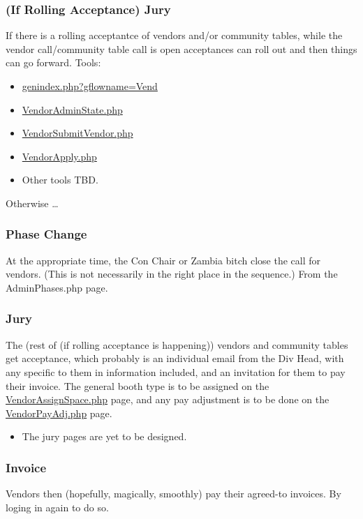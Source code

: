 \documentclass[captions=tablesignature]{scrartcl}
\begin{document}
\subsubsection{(If Rolling Acceptance) Jury}
\label{sec-3-2-13}
If there is a rolling acceptantce of vendors and/or community
tables, while the vendor call/community table call is open
acceptances can roll out and then things can go forward.
Tools: 
\begin{itemize}
\item \href{../webpages/genindex.php?gflowname=Vend}{genindex.php?gflowname=Vend}
\item \href{../webpages/VendorAdminState.php}{VendorAdminState.php}
\item \href{../webpages/VendorSubmitVendor.php}{VendorSubmitVendor.php}
\item \href{../webpages/VendorApply.php}{VendorApply.php}
\item Other tools TBD.
\end{itemize}
Otherwise \ldots{}

\subsubsection{Phase Change}
\label{sec-3-2-14}
At the appropriate time, the Con Chair or Zambia bitch close the
call for vendors. (This is not necessarily in the right place in
the sequence.)  From the AdminPhases.php page.

\subsubsection{Jury}
\label{sec-3-2-15}
The (rest of (if rolling acceptance is happening)) vendors and
community tables get acceptance, which probably is an individual
email from the Div Head, with any specific to them in information
included, and an invitation for them to pay their invoice.  The
general booth type is to be assigned on the \href{../webpages/VendorAssignSpace.php}{VendorAssignSpace.php}
page, and any pay adjustment is to be done on the \href{../webpages/VendorPayAdj.php}{VendorPayAdj.php}
page.
\begin{itemize}
\item The jury pages are yet to be designed.
\end{itemize}

\subsubsection{Invoice}
\label{sec-3-2-16}
Vendors then (hopefully, magically, smoothly) pay their agreed-to
invoices.  By loging in again to do so.
\end{document}
